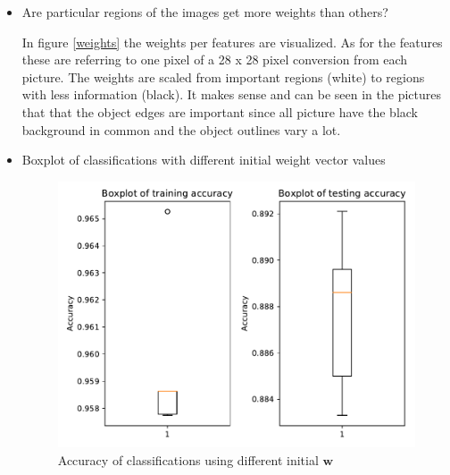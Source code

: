 \documentclass{article}
\begin{document}
\begin{itemize}
    \item Are particular regions of the images get more weights than others?
      
        \begin{figure}[!ht]
		\end{figure}
	
	    In figure \ref{weights} the weights per features are visualized. As for the features these are referring to one pixel of a 28 x 28 pixel conversion from each picture. The weights are scaled from important regions (white) to regions with less information (black). It makes sense and can be seen in the pictures that that the object edges are important since all picture have the black background in common and the object outlines vary a lot.
	  
	\newpage    
    \item Boxplot of classifications with different initial weight vector values
    
        \begin{figure}[!ht]
		\centering
		\includegraphics[width=1 \textwidth]{./Figures/2_boxplot.pdf}
		\caption{Accuracy of classifications using different initial $\mathbf{w}$}
		\label{boxplots}
		\end{figure}
		

\end{itemize}
\end{document}
